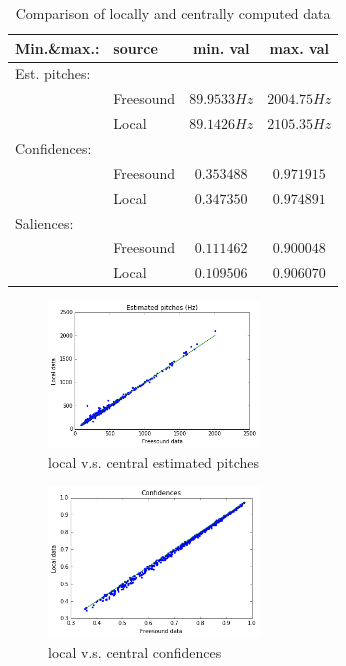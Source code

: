\documentclass{proc}
\begin{document}
\begin{table}[h]
\begin{center}
\begin{tabular}{ | l | l | c | c |}
            \hline
            Min.\&max.: &   source      &   min. val    &   max. val    \\  \hline
            Est. pitches:               &               &               &               \\  \hline 
                                        &   Freesound   &   $89.9533Hz$ &   $2004.75Hz$ \\  \hline
                                        &   Local       &   $89.1426Hz$ &   $2105.35Hz$ \\  \hline
            Confidences:                &               &               &               \\  \hline
                                        &   Freesound   &   $0.353488$  &   $0.971915$  \\  \hline
                                        &   Local       &   $0.347350$  &   $0.974891$  \\  \hline
            Saliences:                  &               &               &               \\  \hline
                                        &   Freesound   &   $0.111462$  &   $0.900048$  \\  \hline
                                        &   Local       &   $0.109506$  &   $0.906070$  \\  \hline
        \end{tabular}
        \caption{Comparison of locally and centrally computed data}
        \label{table:locfrs_comp}
    \end{center}
\end{table}
\begin{figure}
    \centering
    \includegraphics[width=0.5\textwidth]{img/locfrs_pest.png}
    \caption{local v.s. central estimated pitches}
    \label{fig:locfrs_pest}
\end{figure}
\begin{figure}
    \centering
    \includegraphics[width=0.5\textwidth]{img/locfrs_conf.png}
    \caption{local v.s. central confidences}
    \label{fig:locfrs_conf}
\end{figure}
\end{document}
